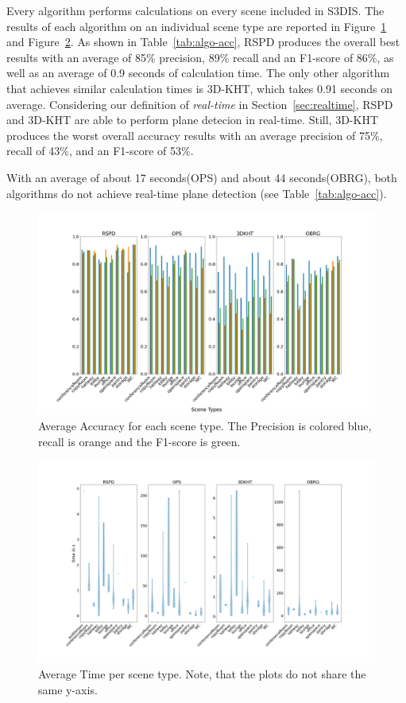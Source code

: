 \documentclass[main.tex]{subfiles}
\begin{document}
Every algorithm performs calculations on every scene included in S3DIS.
The results of each algorithm on an individual scene type are reported in Figure~\ref{fig:stanfordaccuracy} and Figure~\ref{fig:violintime}. As shown in Table~\ref{tab:algo-acc},
RSPD produces the overall best results with an average of 85\% precision, 89\% recall and an F1-score of 86\%, as well as an average of 0.9 seconds of calculation time.
The only other algorithm that achieves similar calculation times is 3D-KHT, which takes 0.91 seconds on average. Considering our definition of \textit{real-time} in Section~\ref{sec:realtime}, 
RSPD and 3D-KHT are able to perform plane detecion in real-time. Still, 3D-KHT produces the worst overall accuracy results with an average precision of 75\%, recall of 43\%, and an F1-score of 53\%.

With an average of about 17 seconds(OPS) and about 44 seconds(OBRG), both algorithms do not achieve real-time plane detection (see Table~\ref{tab:algo-acc}).


\begin{figure}[]
    \centering
    \includegraphics[width=15 cm]{images/accuracy_total.png}
    \caption[Accuracy Results S3DIS]{Average Accuracy for each scene type. The Precision
        is colored blue, recall is orange and the F1-score is green.}
    \label{fig:stanfordaccuracy}
\end{figure}

\begin{figure}[]
    \centering
    \includegraphics[width=15 cm]{images/times_violin.png}
    \caption[Time Results S3DIS]{Average Time per scene type. Note, that the plots
        do not share the same y-axis.}
    \label{fig:violintime}
\end{figure}
\end{document}
